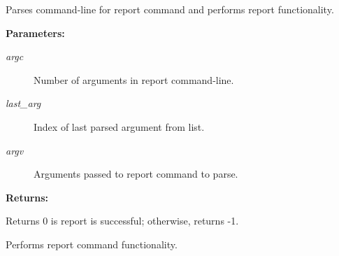 Parses command-line for report command and performs report functionality.

\begin{Desc}
\item[{\bf Parameters: }]\par
\begin{description}
\item[
{\em argc}]Number of arguments in report command-line. \item[
{\em last\_\-arg}]Index of last parsed argument from list. \item[
{\em argv}]Arguments passed to report command to parse.

\end{description}
\end{Desc}
\begin{Desc}
\item[{\bf Returns: }]\par
Returns 0 is report is successful; otherwise, returns -1.

\end{Desc}
Performs report command functionality. 